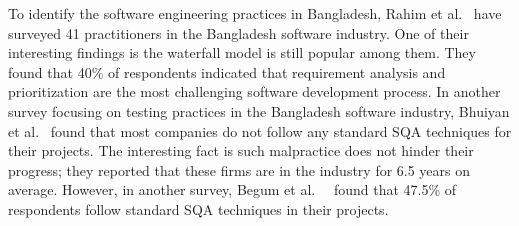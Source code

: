 To identify the software engineering practices in Bangladesh, Rahim et al.~\cite{Rahim2017} have surveyed 41 practitioners in the Bangladesh software industry. One of their interesting findings is the waterfall model is still popular among them. They found that 40\% of respondents indicated that requirement analysis and prioritization are the most challenging software development process. In another survey focusing on testing practices in the Bangladesh software industry, Bhuiyan et al.~\cite{M2018} found that most companies do not follow any standard SQA techniques for their projects. The interesting fact is such malpractice does not hinder their progress; they reported that these firms are in the industry for 6.5 years on average. However, in another survey, Begum et al.~\cite{Begum2009}  found that 47.5\% of respondents follow standard SQA techniques in their projects.